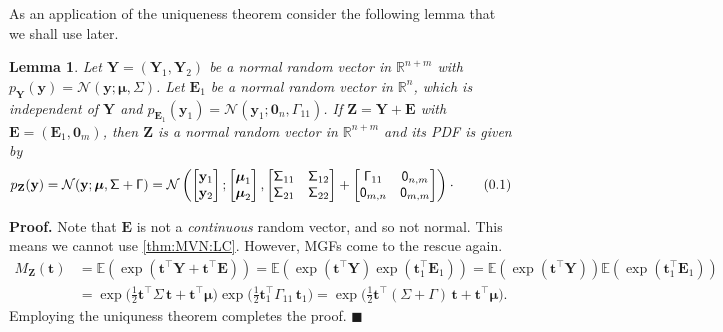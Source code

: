 \documentclass[10pt]{article}
\newtheorem{lem}[thm]{Lemma}
\theoremstyle{definition}
\newenvironment{prf}{\noindent\textbf{Proof.}}{\hfill$\blacksquare$}
\newcommand\eqnum{\addtocounter{equation}{1}\tag{\arabic{section}.\arabic{equation}}}
\begin{document}
As an application of the uniqueness theorem consider the following lemma that we shall use later.
\begin{lem}\label{lem:noise}
Let $\mathbf{Y}=(\mathbf{Y}_1, \mathbf{Y}_2)$ be a normal random vector in $\mathbb{R}^{n+m}$ with $p_{\mathbf{Y}}(\mathbf{y})=\mathcal{N}(\mathbf{y}; \boldsymbol{\mu}, \mathsf{\Sigma})$. Let $\mathbf{E}_1$ be a normal random vector in $\mathbb{R}^n$, which is independent of $\mathbf{Y}$ and $p_{\mathbf{E}_1}(\mathbf{y}_1)=\mathcal{N}(\mathbf{y}_1; \mathbf{0}_n, \mathsf{\Gamma}_{11})$. If $\mathbf{Z} = \mathbf{Y} + \mathbf{E}$ with $\mathbf{E}=(\mathbf{E}_1,\mathbf{0}_m)$, then $\mathbf{Z}$ is a normal random vector in $\mathbb{R}^{n+m}$ and its PDF is given by
\begin{equation}
p_{\mathbf{Z}}(\mathbf{y})
= \mathcal{N}(\mathbf{y}; \boldsymbol{\mu}, \mathsf{\Sigma}+\mathsf{\Gamma})
= \mathcal{N} \left(
\begin{bmatrix}
\mathbf{y}_1 \\
\mathbf{y}_2
\end{bmatrix} ;
\begin{bmatrix}
\boldsymbol{\mu}_1 \\
\boldsymbol{\mu}_2
\end{bmatrix} ,
\begin{bmatrix}
\mathsf{\Sigma}_{11}  & \mathsf{\Sigma}_{12} \\
\mathsf{\Sigma}_{21} & \mathsf{\Sigma}_{22}
\end{bmatrix}
+
\begin{bmatrix}
\mathsf{\Gamma}_{11}  & \mathsf{0}_{n,m} \\
\mathsf{0}_{m,n} & \mathsf{0}_{m,m}
\end{bmatrix}
\right) \cdot
\eqnum
\label{eq:PDF:noise}
\end{equation}
\end{lem}
\begin{prf}
Note that $\mathbf{E}$ is not a \textit{continuous} random vector, and so not normal. This means we cannot use \cref{thm:MVN:LC}. However, MGFs come to the rescue again.
\begin{align*}
M_{\mathbf{Z}}(\mathbf{t}) 
&= \mathbb{E}(\exp(\mathbf{t}^{\top}\mathbf{Y} + \mathbf{t}^{\top}\mathbf{E}))
= \mathbb{E}(\exp(\mathbf{t}^{\top}\mathbf{Y})\exp(\mathbf{t}_1^{\top}\mathbf{E}_1))
= \mathbb{E}(\exp(\mathbf{t}^{\top}\mathbf{Y}))\mathbb{E}(\exp(\mathbf{t}_1^{\top}\mathbf{E}_1)) \\ 
&= \exp\Big(\frac{1}{2}\mathbf{t}^{\top}\mathsf{\Sigma}\,\mathbf{t}+\mathbf{t}^{\top}\boldsymbol{\mu}\Big)
\exp\Big(\frac{1}{2}\mathbf{t}_1^{\top}\mathsf{\Gamma}_{11}\,\mathbf{t}_1\Big) 
=  \exp\Big(\frac{1}{2}\mathbf{t}^{\top}(\mathsf{\Sigma} + \mathsf{\Gamma})\,\mathbf{t}+\mathbf{t}^{\top}\boldsymbol{\mu}\Big).
\end{align*}
Employing the uniquness theorem completes the proof.
\end{prf}
\end{document}
